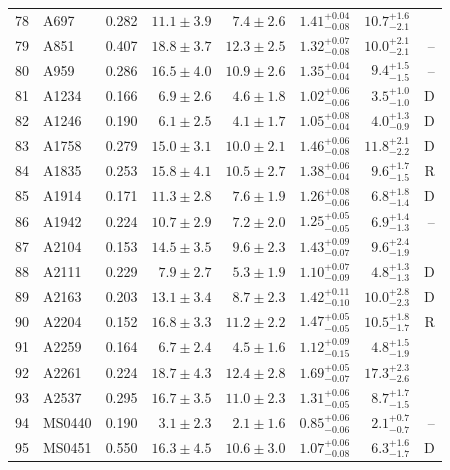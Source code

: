 \documentclass[useAMS,usenatbib]{mnras}
\begin{document}
\begin{table}
\begin{tabularx}{1.0\textwidth}{ l l r r r r r r}
78 & A697 & 0.282 & $11.1 \pm 3.9$ & $7.4 \pm 2.6$ & $1.41_{-0.08}^{+0.04}$ & $10.7_{-2.1}^{+1.6}$ &  \\
79 & A851 & 0.407 & $18.8 \pm 3.7$ & $12.3 \pm 2.5$ & $1.32_{-0.08}^{+0.07}$ & $10.0_{-2.1}^{+2.1}$ & -- \\
80 & A959 & 0.286 & $16.5 \pm 4.0$ & $10.9 \pm 2.6$ & $1.35_{-0.04}^{+0.04}$ & $9.4_{-1.5}^{+1.5}$ & -- \\
81 & A1234 & 0.166 & $6.9 \pm 2.6$ & $4.6 \pm 1.8$ & $1.02_{-0.06}^{+0.06}$ & $3.5_{-1.0}^{+1.0}$ & D \\
82 & A1246 & 0.190 & $6.1 \pm 2.5$ & $4.1 \pm 1.7$ & $1.05_{-0.04}^{+0.08}$ & $4.0_{-0.9}^{+1.3}$ & D \\
83 & A1758 & 0.279 & $15.0 \pm 3.1$ & $10.0 \pm 2.1$ & $1.46_{-0.08}^{+0.06}$ & $11.8_{-2.2}^{+2.1}$ & D \\
84 & A1835 & 0.253 & $15.8 \pm 4.1$ & $10.5 \pm 2.7$ & $1.38_{-0.04}^{+0.06}$ & $9.6_{-1.5}^{+1.7}$ & R \\
85 & A1914 & 0.171 & $11.3 \pm 2.8$ & $7.6 \pm 1.9$ & $1.26_{-0.06}^{+0.08}$ & $6.8_{-1.4}^{+1.8}$ & D \\
86 & A1942 & 0.224 & $10.7 \pm 2.9$ & $7.2 \pm 2.0$ & $1.25_{-0.05}^{+0.05}$ & $6.9_{-1.3}^{+1.4}$ & -- \\
87 & A2104 & 0.153 & $14.5 \pm 3.5$ & $9.6 \pm 2.3$ & $1.43_{-0.07}^{+0.09}$ & $9.6_{-1.9}^{+2.4}$ &  \\
88 & A2111 & 0.229 & $7.9 \pm 2.7$ & $5.3 \pm 1.9$ & $1.10_{-0.09}^{+0.07}$ & $4.8_{-1.3}^{+1.3}$ & D \\
89 & A2163 & 0.203 & $13.1 \pm 3.4$ & $8.7 \pm 2.3$ & $1.42_{-0.10}^{+0.11}$ & $10.0_{-2.3}^{+2.8}$ & D \\
90 & A2204 & 0.152 & $16.8 \pm 3.3$ & $11.2 \pm 2.2$ & $1.47_{-0.05}^{+0.05}$ & $10.5_{-1.7}^{+1.8}$ & R \\
91 & A2259 & 0.164 & $6.7 \pm 2.4$ & $4.5 \pm 1.6$ & $1.12_{-0.15}^{+0.09}$ & $4.8_{-1.9}^{+1.5}$ &  \\
92 & A2261 & 0.224 & $18.7 \pm 4.3$ & $12.4 \pm 2.8$ & $1.69_{-0.07}^{+0.05}$ & $17.3_{-2.6}^{+2.3}$ &  \\
93 & A2537 & 0.295 & $16.7 \pm 3.5$ & $11.0 \pm 2.3$ & $1.31_{-0.05}^{+0.06}$ & $8.7_{-1.5}^{+1.7}$ &  \\
94 & MS0440 & 0.190 & $3.1 \pm 2.3$ & $2.1 \pm 1.6$ & $0.85_{-0.06}^{+0.06}$ & $2.1_{-0.7}^{+0.7}$ & -- \\
95 & MS0451 & 0.550 & $16.3 \pm 4.5$ & $10.6 \pm 3.0$ & $1.07_{-0.08}^{+0.06}$ & $6.3_{-1.7}^{+1.6}$ & D \\

\end{tabularx}
\end{table}
\end{document}
